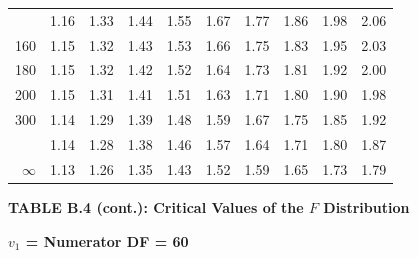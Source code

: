 \documentclass[10pt]{article}
\begin{document}
\begin{longtable}{@{}r!{\vrule width 0.8pt\hspace{0.55em}}rrrrrrrrr@{}}
 & 1.16 & 1.33 & 1.44 & 1.55 & 1.67 & 1.77 & 1.86 & 1.98 & 2.06 \\
160 & 1.15 & 1.32 & 1.43 & 1.53 & 1.66 & 1.75 & 1.83 & 1.95 & 2.03 \\
180 & 1.15 & 1.32 & 1.42 & 1.52 & 1.64 & 1.73 & 1.81 & 1.92 & 2.00 \\
200 & 1.15 & 1.31 & 1.41 & 1.51 & 1.63 & 1.71 & 1.80 & 1.90 & 1.98 \\
300 & 1.14 & 1.29 & 1.39 & 1.48 & 1.59 & 1.67 & 1.75 & 1.85 & 1.92 \\
 & 1.14 & 1.28 & 1.38 & 1.46 & 1.57 & 1.64 & 1.71 & 1.80 & 1.87 \\
$\infty$ & 1.13 & 1.26 & 1.35 & 1.43 & 1.52 & 1.59 & 1.65 & 1.73 & 1.79 \\
\end{longtable}
\newpage
\thispagestyle{empty}
\begin{center}
{\large\bfseries TABLE B.4 (cont.): Critical Values of the $F$ Distribution\par}
\end{center}
{\large\bfseries $v_1$ = Numerator DF = 60\par}
\vspace{0.5em}
\small
\end{document}
